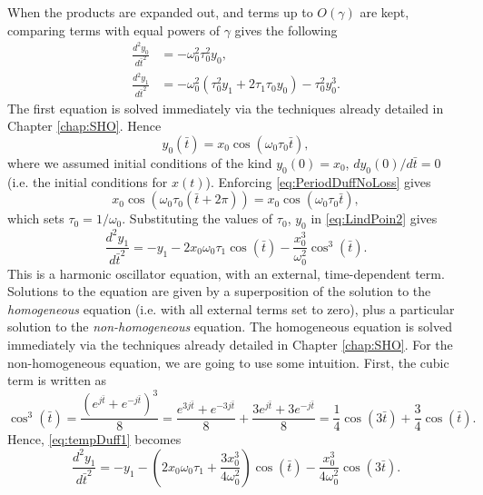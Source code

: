 \documentclass[11pt,twoside,a4paper,english]{book}
\begin{document}
When the products are expanded out, and terms up to $O(\gamma)$ are kept, comparing terms with equal powers of $\gamma$ gives the following
\begin{subequations}
    \begin{align}
          \frac{d^2 y_0}{d\bar t^2} &= -\omega_0^2 \tau_0^2 y_0, \label{eq:LindPoin1}\\
          \frac{d^2 y_1}{d\bar t^2} &= -\omega_0^2 \left(\tau_0^2 y_1 + 2 \tau_1\tau_0 y_0\right) - \tau_0^2 y_0^3. \label{eq:LindPoin2}
    \end{align}
\end{subequations}
The first equation is solved immediately via the techniques already detailed in Chapter \ref{chap:SHO}. Hence
\begin{equation}
y_0(\bar t) = x_0 \cos(\omega_0 \tau_0 \bar t),
\end{equation}
where we assumed initial conditions of the kind $y_0(0) = x_0$, $dy_0(0)/d\bar t = 0$ (i.e. the initial conditions for $x(t)$). Enforcing \eqref{eq:PeriodDuffNoLoss} gives
\begin{equation}
x_0 \cos(\omega_0\tau_0(\bar t+2\pi)) = x_0 \cos(\omega_0\tau_0\bar t),
\end{equation}
which sets $\tau_0 = 1/\omega_0$. Substituting the values of $\tau_0$, $y_0$ in \eqref{eq:LindPoin2} gives
\begin{equation}\label{eq:tempDuff1}
\frac{d^2 y_1}{d\bar t^2} = - y_1 - 2x_0 \omega_0\tau_1 \cos(\bar t) - \frac{x_0^3}{\omega_0^2}\cos^3(\bar t) .
\end{equation}
This is a harmonic oscillator equation, with an external, time-dependent term. Solutions to the equation are given by a superposition of the solution to the \emph{homogeneous} equation (i.e. with all external terms set to zero), plus a particular solution to the \emph{non-homogeneous} equation. The homogeneous equation is solved immediately via the techniques already detailed in Chapter \ref{chap:SHO}. For the non-homogeneous equation, we are going to use some intuition. First, the cubic term is written as
\begin{equation}
\cos^3 (\bar t) = \frac{\left(e^{j\bar t} + e^{-j\bar t}\right)^3}{8} = \frac{e^{3j\bar t} + e^{-3j\bar t}}{8} + \frac{3 e^{j\bar t} + 3  e^{-j\bar t}}{8} = \frac{1}{4}\cos(3 \bar t) + \frac{3}{4}\cos(\bar t).
\end{equation}
Hence, \eqref{eq:tempDuff1} becomes
\begin{equation}\label{eq:tempDuff2}
\frac{d^2 y_1}{d\bar t^2} = - y_1 - \left(2x_0\omega_0\tau_1 + \frac{3 x_0^3}{4\omega_0^2}\right)\cos(\bar t) - \frac{x_0^3}{4\omega_0^2}\cos(3\bar t).
\end{equation}
\end{document}
